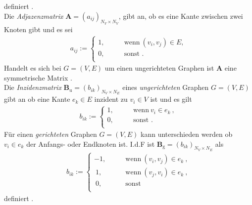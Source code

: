 \documentclass[12pt, a4paper]{report}
\begin{document}
definiert \cite{diestel2006graph}.\\
Die \textit{Adjazenzmatrix} $\textbf{A}=(a_{ij})_{N_V \times N_V}$, gibt an, ob es eine Kante zwischen zwei Knoten gibt und es sei 
\begin{align}
a_{ij} := \begin{cases}
1, \qquad &\text{wenn} \ (v_i,v_j) \in E,\\
0, \qquad &\text{sonst \ .}\\
\end{cases}
\end{align}
Handelt es sich bei $G=(V,E)$ um einen ungerichteten Graphen ist $\textbf{A}$ eine symmetrische Matrix \cite{kolaczyk2009statistical}.\\
Die \textit{Inzidenzmatrix} $\textbf{B}_{\text{u}}=(b_{ik})_{N_V \times N_E}$ eines \textit{ungerichteten} Graphen $G=(V,E)$ gibt an ob eine Kante $e_k \in E$ inzident zu $v_i \in V$ ist \cite{kolaczyk2009statistical} und es gilt
\begin{align}
b_{ik} := \begin{cases}
1, \qquad &\text{wenn} \ v_i \in e_k \ ,\\
0, \qquad &\text{sonst .}\\
\end{cases}
\end{align}
Für einen \textit{gerichteten} Graphen $G=(V,E)$ kann unterschieden werden ob $v_i \in e_k$ der Anfangs- oder Endknoten ist. \mbox{I.d.F} ist $\textbf{B}_{\text{g}}=(b_{ik})_{N_V \times N_E}$ als
\begin{align}
b_{ik} := \begin{cases}
-1, \qquad &\text{wenn} \ (v_i,v_j) \in e_k \ ,\\
\ 1, \qquad &\text{wenn} \ (v_j,v_i) \in e_k \ ,\\
\ 0, \qquad &\text{sonst}\\
\end{cases}
\end{align}
definiert \cite{brandes2005graphfunda}.



\end{document}
